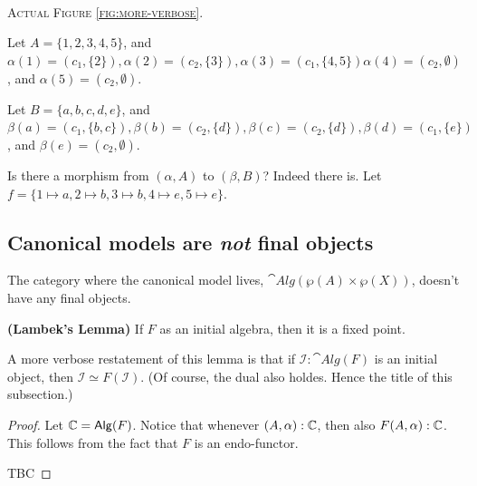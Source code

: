 \begin{minipage}[b]{0.3\linewidth}
\begin{center}
\\
\textsc{Actual Figure \ref{fig:more-verbose}. } 
\end{center}
\end{minipage}


Let $A = \{1, 2, 3, 4, 5\}$, and $\alpha(1) = (c_1, \{2\}), \alpha(2) = (c_2, \{3\}), \alpha(3) = (c_1, \{4, 5\}) \alpha(4) = (c_2, \emptyset)$, and $\alpha(5) = (c_2, \emptyset)$.

Let $B = \{a, b, c, d, e\}$, and $\beta(a) = (c_1, \{b, c\}), \beta(b) = (c_2, \{d\}), \beta(c) = (c_2, \{d\}), \beta(d) = (c_1, \{e\})$, and $\beta(e) = (c_2, \emptyset)$.

Is there a morphism from $(\alpha, A)$ to $(\beta, B)$? Indeed there is. Let $f = \{1 \mapsto a, 2 \mapsto b, 3 \mapsto b, 4 \mapsto e, 5 \mapsto e\}$.



\subsection{Canonical models are \emph{not} final objects} The category where the canonical model lives, $\cat{Alg}(\wp(A) \times \wp(X))$, doesn't have any final objects.

\begin{lem}
  \textbf{(Lambek's Lemma)} If $F$ as an initial algebra, then it is a fixed point.
\end{lem}

A more verbose restatement of this lemma is that if $\mathcal I : \cat{Alg}(F)$ is an initial object, then $\mathcal I \simeq F(\mathcal I)$. (Of course, the dual also holdes. Hence the title of this subsection.)

\begin{proof}
  Let $\mathbb{C} = \mathsf{Alg}(F)$. Notice that whenever $(A, \alpha) : \mathbb{C}$, then also $F(A, \alpha) : \mathbb{C}$. This follows from the fact that $F$ is an endo-functor.

TBC
 
\end{proof}

